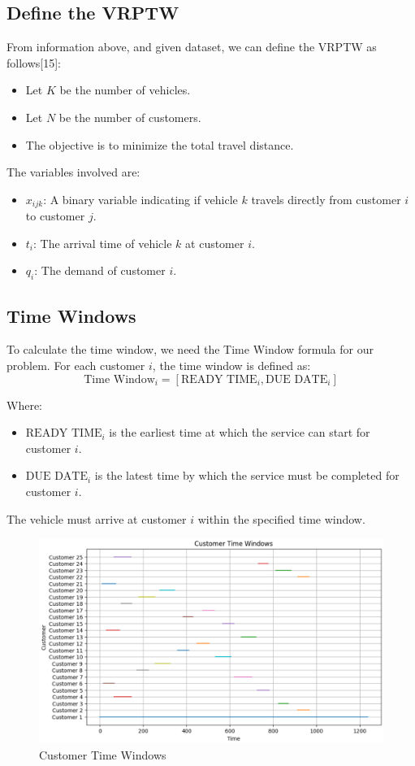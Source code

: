 \subsection{Define the VRPTW}
From information above, and given dataset, we can define the VRPTW as follows[15]:
\begin{itemize}
    \item Let \( K \) be the number of vehicles.
    \item Let \( N \) be the number of customers.
    \item The objective is to minimize the total travel distance.
\end{itemize}

The variables involved are:
\begin{itemize}
    \item \( x_{ijk} \): A binary variable indicating if vehicle \( k \) travels directly from customer \( i \) to customer \( j \).
    \item \( t_i \): The arrival time of vehicle \( k \) at customer \( i \).
    \item \( q_i \): The demand of customer \( i \).
\end{itemize}

\subsection{Time Windows}
To calculate the time window, we need the Time Window formula for our problem. For each customer \( i \), the time window is defined as:
\[
\text{Time Window}_i = [\text{READY TIME}_i, \text{DUE DATE}_i]
\]

Where:
\begin{itemize}
    \item \( \text{READY TIME}_i \) is the earliest time at which the service can start for customer \( i \).
    \item \( \text{DUE DATE}_i \) is the latest time by which the service must be completed for customer \( i \).
\end{itemize}

The vehicle must arrive at customer \( i \) within the specified time window.
\begin{figure}[H]
    \centering
    \includegraphics[width=0.8\linewidth]{figures/Customer_Time_Window.PNG}
    \caption{Customer Time Windows}
    \label{fig:Customer Time Windows}
\end{figure}

